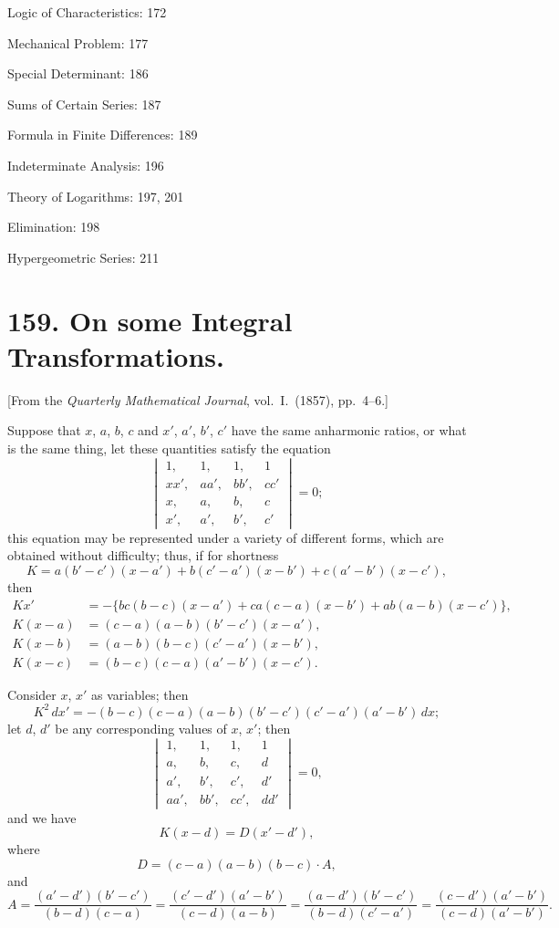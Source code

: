 \documentclass[12pt,a4paper]{article}
\theoremstyle{plain}
\begin{document}
Logic of Characteristics: 172

Mechanical Problem: 177

Special Determinant: 186

Sums of Certain Series: 187

Formula in Finite Differences: 189

Indeterminate Analysis: 196

Theory of Logarithms: 197, 201

Elimination: 198

Hypergeometric Series: 211

\clearpage

\section*{159. On some Integral Transformations.}

[From the \textit{Quarterly Mathematical Journal}, vol.~I.\ (1857), pp.~4--6.]

Suppose that $x$, $a$, $b$, $c$ and $x'$, $a'$, $b'$, $c'$ have the same anharmonic ratios, or what is the same thing, let these quantities satisfy the equation
\[
\begin{vmatrix}
1, & 1, & 1, & 1 \\
xx', & aa', & bb', & cc' \\
x, & a, & b, & c \\
x', & a', & b', & c'
\end{vmatrix}
= 0;
\]
this equation may be represented under a variety of different forms, which are obtained without difficulty; thus, if for shortness
\[
K = a(b'-c')(x-a') + b(c'-a')(x-b') + c(a'-b')(x-c'),
\]
then
\begin{align*}
Kx' &= -\{bc(b-c)(x-a') + ca(c-a)(x-b') + ab(a-b)(x-c')\}, \\
K(x-a) &= (c-a)(a-b)(b'-c')(x-a'), \\
K(x-b) &= (a-b)(b-c)(c'-a')(x-b'), \\
K(x-c) &= (b-c)(c-a)(a'-b')(x-c').
\end{align*}

Consider $x$, $x'$ as variables; then
\[
K^2 \, dx' = -(b-c)(c-a)(a-b)(b'-c')(c'-a')(a'-b') \, dx;
\]
let $d$, $d'$ be any corresponding values of $x$, $x'$; then
\[
\begin{vmatrix}
1, & 1, & 1, & 1 \\
a, & b, & c, & d \\
a', & b', & c', & d' \\
aa', & bb', & cc', & dd'
\end{vmatrix}
= 0,
\]
and we have
\[
K(x-d) = D(x'-d'),
\]
where
\[
D = (c-a)(a-b)(b-c) \cdot A,
\]
and
\[
A = \frac{(a'-d')(b'-c')}{(b-d)(c-a)} = \frac{(c'-d')(a'-b')}{(c-d)(a-b)} = \frac{(a-d')(b'-c')}{(b-d)(c'-a')} = \frac{(c-d')(a'-b')}{(c-d)(a'-b')}.
\]
\end{document}
